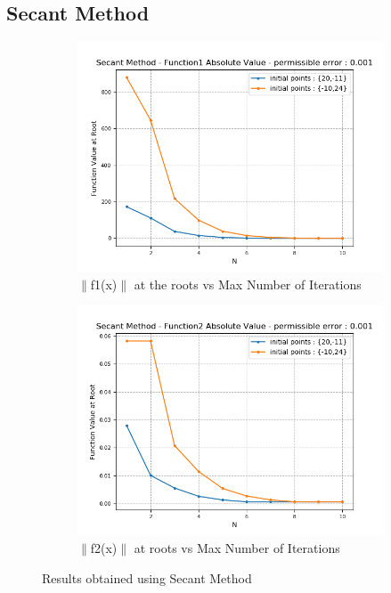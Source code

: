 \documentclass[11pt]{article}
\begin{document}
\subsection{Secant Method}
\begin{figure} [h!]
	\centering
	\begin{subfigure}{0.55\textwidth}
		\centering
		\includegraphics[width=\linewidth]{secm-f1-abs}
		\caption{$\|$f1(x)$\|$ at the roots vs Max Number of Iterations}
		\label{fig3:sub1}
	\end{subfigure}%
	\begin{subfigure}{0.55\textwidth}
		\centering
		\includegraphics[width=\linewidth]{secm-f2-abs}
		\caption{$\|$f2(x)$\|$ at roots vs Max Number of Iterations}
		\label{fig3:sub2}
	\end{subfigure}
	\caption{Results obtained using Secant Method}
\end{figure}
\end{document}
